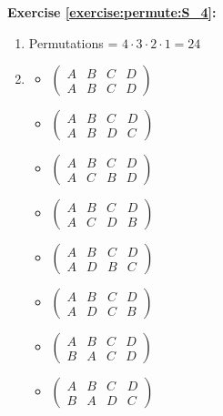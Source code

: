 \noindent\textbf{Exercise \ref{exercise:permute:S_4}:}
\begin{enumerate}[{a.}]
\item
Permutations = $4 \cdot 3 \cdot 2 \cdot 1 = 24$

\item
	\begin{multicols}{3}
	\begin{itemize}
	\item
	$\begin{pmatrix}
	A & B & C & D\\
	A & B & C & D
	\end{pmatrix}$

	\item
	$\begin{pmatrix}
	A & B & C & D\\
	A & B & D & C
	\end{pmatrix}$
	
	\item
	$\begin{pmatrix}
	A & B & C & D\\
	A & C & B & D
	\end{pmatrix}$
	
	\item
	$\begin{pmatrix}
	A & B & C & D\\
	A & C & D & B
	\end{pmatrix}$
	
	\item
	$\begin{pmatrix}
	A & B & C & D\\
	A & D & B & C
	\end{pmatrix}$
	
	\item
	$\begin{pmatrix}
	A & B & C & D\\
	A & D & C & B
	\end{pmatrix}$
	
	\item
	$\begin{pmatrix}
	A & B & C & D\\
	B & A & C & D
	\end{pmatrix}$

	\item
	$\begin{pmatrix}
	A & B & C & D\\
	B & A & D & C
	\end{pmatrix}$
	

\end{itemize}
\end{multicols}
\end{enumerate}
